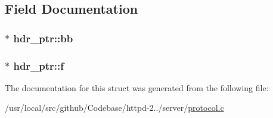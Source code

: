\subsection{Field Documentation}
\subsubsection[{\texorpdfstring{bb}{bb}}]{$\ast$ hdr\+\_\+ptr\+::bb}\hypertarget{structhdr__ptr_a92d1c8778907c80a8041d320cc568fb3}{}\label{structhdr__ptr_a92d1c8778907c80a8041d320cc568fb3}
\subsubsection[{\texorpdfstring{f}{f}}]{$\ast$ hdr\+\_\+ptr\+::f}\hypertarget{structhdr__ptr_aa0aa52ee9894e6caffcc265edf225878}{}\label{structhdr__ptr_aa0aa52ee9894e6caffcc265edf225878}


The documentation for this struct was generated from the following file\+:\begin{DoxyCompactItemize}
\item 
/usr/local/src/github/\+Codebase/httpd-\/2../server/\hyperlink{protocol_8c}{protocol.\+c}\end{DoxyCompactItemize}
